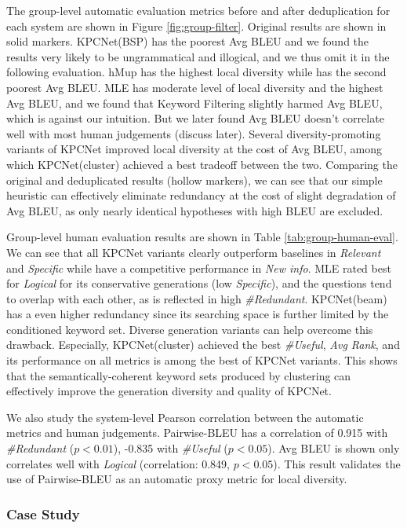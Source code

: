 The group-level automatic evaluation metrics before and after deduplication for each system are shown in Figure \ref{fig:group-filter}. Original results are shown in solid markers. KPCNet(BSP) has the poorest Avg BLEU and we found the results very likely to be ungrammatical and illogical, and we thus omit it in the following evaluation. hMup has the highest local diversity while has the second poorest Avg BLEU. MLE has moderate level of local diversity and the highest Avg BLEU, and we found that Keyword Filtering slightly harmed Avg BLEU, which is against our intuition. But we later found Avg BLEU doesn't correlate well with most human judgements (discuss later). Several diversity-promoting variants of KPCNet improved local diversity at the cost of Avg BLEU, among which KPCNet(cluster) achieved a best tradeoff between the two. Comparing the original and deduplicated results (hollow markers), we can see that our simple heuristic can effectively eliminate redundancy at the cost of slight degradation of Avg BLEU, as only nearly identical hypotheses with high BLEU are excluded. 

Group-level human evaluation results are shown in Table \ref{tab:group-human-eval}. We can see that all KPCNet variants clearly outperform baselines in \textit{Relevant} and \textit{Specific} while have a competitive performance in \textit{New info}. MLE rated best for \textit{Logical} for its conservative generations (low \textit{Specific}), and the questions tend to overlap with each other, as is reflected in high \textit{\#Redundant}. KPCNet(beam) has a even higher redundancy since its searching space is further limited by the conditioned keyword set. Diverse generation variants can help overcome this drawback. Especially, KPCNet(cluster) achieved the best \textit{\#Useful}, \textit{Avg Rank}, and its performance on all metrics is among the best of KPCNet variants. This shows that the semantically-coherent keyword sets produced by clustering can effectively improve the generation diversity and quality of KPCNet. 

We also study the system-level Pearson correlation between the automatic metrics and human judgements. Pairwise-BLEU has a correlation  of 0.915 with \textit{\#Redundant} ($p<0.01$), -0.835 with \textit{\#Useful} ($p<0.05$). Avg BLEU is shown only correlates well with \textit{Logical} (correlation: 0.849, $p<0.05$). This result validates the use of Pairwise-BLEU as an automatic proxy metric for local diversity.

\subsubsection{Case Study}


